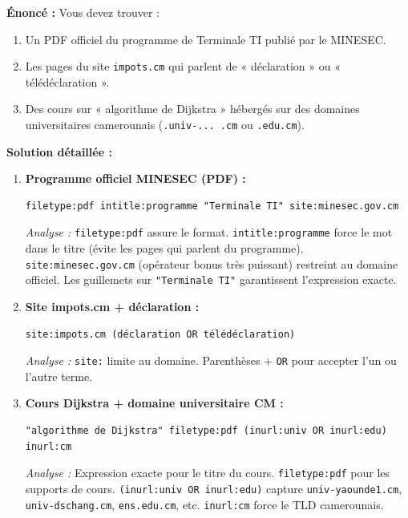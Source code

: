 \documentclass[11pt]{article}
\begin{document}
\begin{exoresolu}
\textbf{Énoncé :} Vous devez trouver :
\begin{enumerate}
    \item Un PDF officiel du programme de Terminale TI publié par le MINESEC.
    \item Les pages du site \texttt{impots.cm} qui parlent de « déclaration » ou « télédéclaration ».
    \item Des cours sur « algorithme de Dijkstra » hébergés sur des domaines universitaires camerounais (\texttt{.univ-... .cm} ou \texttt{.edu.cm}).
\end{enumerate}

\textbf{Solution détaillée :}

\begin{enumerate}
    \item \textbf{Programme officiel MINESEC (PDF) :}
    \begin{lstlisting}[basicstyle=\ttfamily\small]
filetype:pdf intitle:programme "Terminale TI" site:minesec.gov.cm
    \end{lstlisting}
    \textit{Analyse :} \texttt{filetype:pdf} assure le format. \texttt{intitle:programme} force le mot dans le titre (évite les pages qui parlent du programme). \texttt{site:minesec.gov.cm} (opérateur bonus très puissant) restreint au domaine officiel. Les guillemets sur \texttt{"Terminale TI"} garantissent l'expression exacte.

    \item \textbf{Site impots.cm + déclaration :}
    \begin{lstlisting}[basicstyle=\ttfamily\small]
site:impots.cm (déclaration OR télédéclaration)
    \end{lstlisting}
    \textit{Analyse :} \texttt{site:} limite au domaine. Parenthèses + \texttt{OR} pour accepter l'un ou l'autre terme.

    \item \textbf{Cours Dijkstra + domaine universitaire CM :}
    \begin{lstlisting}[basicstyle=\ttfamily\small]
"algorithme de Dijkstra" filetype:pdf (inurl:univ OR inurl:edu) inurl:cm
    \end{lstlisting}
    \textit{Analyse :} Expression exacte pour le titre du cours. \texttt{filetype:pdf} pour les supports de cours. \texttt{(inurl:univ OR inurl:edu)} capture \texttt{univ-yaounde1.cm}, \texttt{univ-dschang.cm}, \texttt{ens.edu.cm}, etc. \texttt{inurl:cm} force le TLD camerounais.
\end{enumerate}
\end{exoresolu}
\end{document}
